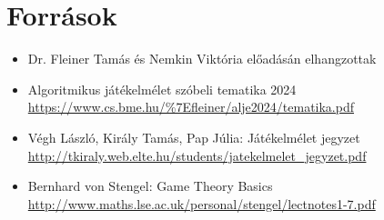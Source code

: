 \newpage
\section{Források}
\begin{itemize}
    \item Dr. Fleiner Tamás és Nemkin Viktória előadásán elhangzottak
    \item Algoritmikus játékelmélet szóbeli tematika 2024 \url{https://www.cs.bme.hu/\%7Efleiner/alje2024/tematika.pdf}
    \item Végh László, Király Tamás, Pap Júlia: Játékelmélet jegyzet \url{http://tkiraly.web.elte.hu/students/jatekelmelet_jegyzet.pdf}
    \item Bernhard von Stengel: Game Theory Basics \url{http://www.maths.lse.ac.uk/personal/stengel/lectnotes1-7.pdf}     
\end{itemize}


